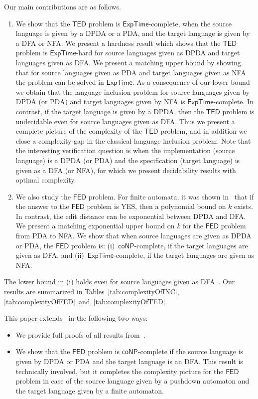 \documentclass{CSML}
\newcommand{\EXPTIME}{\textsf{ExpTime}}
\newcommand{\coNP}{\textsf{coNP}}
\newcommand{\TED}{\mathsf{TED}}
\newcommand{\FED}{\mathsf{FED}}
\begin{document}
\smallskip{}
Our main contributions are as follows.
\begin{enumerate}
\item We show that the $\TED$ problem is $\EXPTIME$-complete, when the source 
language is given by a DPDA or a PDA, and the target language is given by 
a DFA or NFA. 
We present a hardness result which shows that the $\TED$ problem is $\EXPTIME$-hard 
for source languages given as DPDA and target languages given as DFA. 
We present a matching upper bound by showing that for source languages given 
as PDA and target languages given as NFA the problem can be solved in $\EXPTIME$. 
As a consequence of our lower bound we obtain that the language inclusion 
problem for source languages given by DPDA (or PDA) and target languages given by NFA is $\EXPTIME$-complete.
In contrast, if the target language is given by a DPDA, then the $\TED$ 
problem is undecidable even for source languages given as DFA.
Thus we present a complete picture of the complexity of the $\TED$ problem, and 
in addition we close a complexity gap in the classical language inclusion problem.
Note that the interesting verification question is when the implementation 
(source language) is a DPDA (or PDA) and the specification (target language)
is given as a DFA (or NFA), for which we present decidability results
with optimal complexity.

\item We also study the $\FED$ problem.
For finite automata, it was shown in~\cite{riveros,boundedRiveros} that if the answer 
to the $\FED$ problem is YES, then a polynomial bound on $k$ exists.
In contrast, the edit distance can be exponential between DPDA and DFA.
We present a matching exponential upper bound on $k$ for the $\FED$ problem 
from PDA to NFA.
We show that when source languages are given as DPDA or PDA, 
the $\FED$ problem is:
(i)~$\coNP$-complete, if the target languages are given as DFA, and
(ii)~$\EXPTIME$-complete, if the target languages are given as NFA.
\end{enumerate}
The lower bound in (i) holds even for source languages given as DFA~\cite{boundedRiveros}.
Our results are summarized in Tables~\ref{tab:complexityOfINC}, \ref{tab:complexityOfFED}~and~\ref{tab:complexityOfTED}.

This paper extends~\cite{editDistanceConference} in the following two ways:
\begin{itemize}
\item We provide full proofs of all results from~\cite{editDistanceConference}.
\item We show that the $\FED$ problem is $\coNP$-complete if the source language is given by 
DPDA or PDA and the target language is an DFA. This result is technically involved, but it completes 
the complexity picture for the $\FED$ problem in case of 
the source language given by a pushdown automaton and the target language given by a finite automaton. 
\end{itemize}
\end{document}
